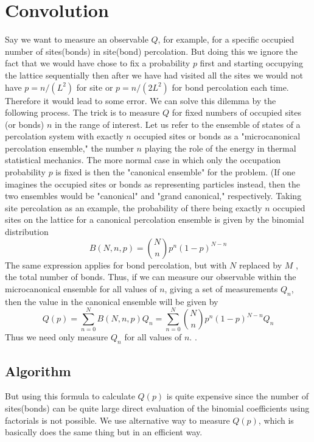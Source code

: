 



\chapter{Convolution}
\label{appendix.convolution}
Say we want to measure an observable $Q$, for example, for a specific occupied number of sites(bonds) in site(bond) percolation. But doing this we ignore the fact that we would have chose to fix a probability $p$ first and starting occupying the lattice sequentially then after we have had visited all the sites we would not have $p=n/(L^2)$ for site or $p=n/(2 L^2)$ for bond percolation each time. Therefore it would lead to some error. We can solve this dilemma by the following process. 
The trick \cite{Hu1992, Gould2006} is to measure $Q$ for fixed numbers of occupied sites (or bonds) $n$ in the range of interest. Let us refer to the ensemble of states of a percolation system with exactly $n$ occupied sites or bonds as a "microcanonical percolation ensemble," the number $n$ playing the role of the energy in thermal statistical mechanics. The more normal case in which only the occupation probability $p$ is fixed is then the "canonical ensemble" for the problem. (If one imagines the occupied sites or bonds as representing particles instead, then the two ensembles would be "canonical" and "grand canonical," respectively. Taking site
percolation as an example, the probability of there being
exactly $n$ occupied sites on the lattice for a canonical percolation ensemble is given by the binomial distribution
	\begin{equation}
		B(N,n,p) = {N\choose n} p^n (1-p)^{N-n}
	\end{equation}
	The same expression applies for bond percolation, but
	with $N$ replaced by $M$ , the total number of bonds.	Thus, if we can measure our observable within the microcanonical ensemble for all values of $n$, giving a set
	of measurements ${Q_n}$, then the value in the canonical
	ensemble will be given by
	\begin{equation}
		Q(p) 
		= \sum_{n=0}^{N} B(N,n,p) Q_n 
		= \sum_{n=0}^{N} {N\choose n} p^n(1-p)^{N-n} Q_n 	
	\end{equation}
	Thus we need only measure $Q_n$ for all values of $n$.
	\cite{Newman2001}.
	
	

	
\section{Algorithm}
	But using this formula to calculate $Q(p)$ is quite expensive since the number of sites(bonds) can be quite large  direct evaluation of the binomial coefficients using factorials is not possible. We use alternative way to measure $Q(p)$, which is basically does the same thing but in an efficient way.
 
